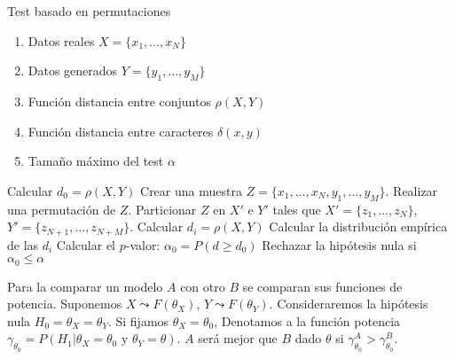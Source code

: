 \begin{algorithm}
	\caption{Test basado en permutaciones}
	\begin{algorithmic}[1]
	\REQUIRE
		\begin{enumerate}[a]
		\item Datos reales $X = \{ x_1, \dots, x_N \}$
		\item Datos generados $Y = \{ y_1, \dots, y_M \}$
		\item Función distancia entre conjuntos $\rho(X,Y)$
		\item Función distancia entre caracteres $\delta(x,y)$
		\item Tamaño máximo del test $\alpha$
		\end{enumerate}
		\STATE Calcular $d_0 = \rho(X,Y)$
		\STATE Crear una muestra $Z= \{x_1, \dots, x_N, y_1, \dots, y_M \}$.
			\STATE Realizar una permutación de $Z$.
			\STATE Particionar $Z$ en $X'$ e $Y'$ tales que $X' = \{ z_1, \dots, z_N \}$, $Y' = \{ z_{N+1}, \dots, z_{N+M} \} $.
			\STATE Calcular $d_i = \rho(X,Y)$
		\ENDFOR
		\STATE Calcular la distribución empírica de las $d_i$
		\STATE Calcular el $p$-valor: $\alpha_0 = P(d \geq d_0)$
		\STATE Rechazar la hipótesis nula si $\alpha_0 \leq \alpha$
	\end{algorithmic}
\end{algorithm}

	Para la comparar un modelo $A$ con otro $B$ se comparan sus funciones de potencia. Suponemos $X \leadsto F(\theta_X)$, $Y \leadsto F(\theta_Y)$. Consideraremos la hipótesis nula $H_0 = \theta_X = \theta_Y$. Si fijamos $\theta_X= \theta_0$, Denotamos a la función potencia $\gamma_{\theta_0}= P(H_1 | \theta_X = \theta_0 \text{ y } \theta_Y = \theta)$. $A$ será mejor que $B$ dado $\theta$ si $\gamma_{\theta_0}^A  >\gamma_{\theta_0}^B$.
	
